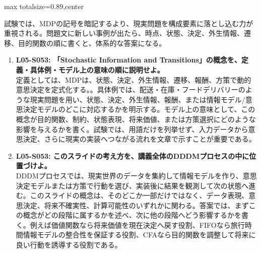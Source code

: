 \begin{minipage}[t]{0.58\textwidth}
\begin{adjustbox}{max totalsize={\textwidth}{0.89\textheight},center}
\begin{minipage}{\textwidth}
試験では、MDPの記号を暗記するより、現実問題を構成要素に落とし込む力が重視される。問題文に新しい事例が出たら、時点、状態、決定、外生情報、遷移、目的関数の順に書くと、体系的な答案になる。\par{}\begin{enumerate}\item \textbf{L05-S053: 「Stochastic Information and Transitions」の概念を、定義・具体例・モデル上の意味の順に説明せよ。}\\定義としては、MDPは、状態、決定、外生情報、遷移、報酬、方策で動的意思決定を定式化する。。具体例では、配送・在庫・フードデリバリーのような現実問題を用い、状態、決定、外生情報、報酬、または情報モデル/意思決定モデルのどこに対応するかを明示する。モデル上の意味として、この概念が目的関数、制約、状態表現、将来価値、または方策選択にどのような影響を与えるかを書く。試験では、用語だけを列挙せず、入力データから意思決定、さらに現実の実装へつながる流れを文章で示すことが重要である。\item \textbf{L05-S053: このスライドの考え方を、講義全体のDDDMプロセスの中に位置づけよ。}\\DDDMプロセスでは、現実世界のデータを集約して情報モデルを作り、意思決定モデルまたは方策で行動を選び、実装後に結果を観測して次の状態へ進む。このスライドの概念は、そのどこか一部だけではなく、データ表現、意思決定、将来不確実性、計算可能性のいずれかに関わる。答案では、まずこの概念がどの段階に属するかを述べ、次に他の段階へどう影響するかを書く。例えば価値関数なら将来価値を現在決定へ戻す役割、FIFOなら旅行時間情報モデルの整合性を保証する役割、CFAなら目的関数を調整して将来に良い行動を誘導する役割である。\end{enumerate}
\end{minipage}
\end{adjustbox}
\end{minipage}


